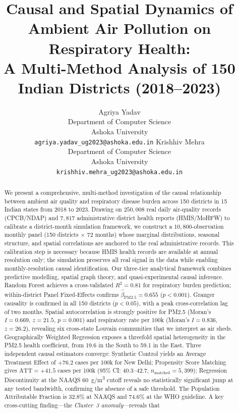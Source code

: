 \documentclass{article}
\title{Causal and Spatial Dynamics of Ambient Air Pollution on Respiratory Health:\\
A Multi-Method Analysis of 150 Indian Districts (2018--2023)}
\author{%
  Agriya Yadav \\
  Department of Computer Science \\
  Ashoka University \\
  \texttt{agriya.yadav\_ug2023@ashoka.edu.in}
  \And
  Krishhiv Mehra \\
  Department of Computer Science \\
  Ashoka University \\
  \texttt{krishhiv.mehra\_ug2023@ashoka.edu.in}
}
\begin{document}
\maketitle

\begin{abstract}
We present a comprehensive, multi-method investigation of the causal relationship between
ambient air quality and respiratory disease burden across 150 districts in 15 Indian states
from 2018 to 2023. Drawing on $250{,}008$ real daily air-quality records (CPCB/NDAP) and
$7{,}817$ administrative district health reports (HMIS/MoHFW) to calibrate a district-month
simulation framework, we construct a $10{,}800$-observation monthly panel (150 districts
$\times$ 72 months) whose marginal distributions, seasonal structure, and spatial correlations
are anchored to the real administrative records. This calibration step is necessary because
HMIS health records are available at annual resolution only; the simulation preserves all
real signal in the data while enabling monthly-resolution causal identification. Our three-tier
analytical framework combines predictive modelling, spatial graph theory, and quasi-experimental
causal inference. Random Forest achieves a cross-validated $R^2 = 0.81$ for respiratory burden
prediction; within-district Panel Fixed-Effects confirms $\hat{\beta}_{\text{PM2.5}} = 0.655$
($p < 0.001$). Granger causality is confirmed in all 150 districts ($p < 0.05$), with a
peak cross-correlation lag of two months. Spatial autocorrelation is strongly positive for
PM2.5 (Moran's $I = 0.669$, $z = 21.5$, $p = 0.001$) and respiratory rate per 100k
(Moran's $I = 0.836$, $z = 26.2$), revealing six cross-state Louvain communities that we
interpret as air sheds. Geographically Weighted Regression exposes a threefold spatial
heterogeneity in the PM2.5 health coefficient, from 19.6 in the South to 59.1 in the East.
Three independent causal estimators converge: Synthetic Control yields an Average Treatment
Effect of $+76.2$ cases per 100k for New Delhi; Propensity Score Matching gives
$\mathrm{ATT} = +41.5$ cases per 100k (95\% CI: 40.3--42.7, $n_{\text{matched}} = 5{,}399$);
Regression Discontinuity at the NAAQS 60~\textmu{}g/m\textsuperscript{3} cutoff reveals no
statistically significant jump at any tested bandwidth, confirming the absence of a safe
threshold. The Population Attributable Fraction is 32.8\% at NAAQS and 74.6\% at the WHO
guideline. A key cross-cutting finding---the \emph{Cluster~3 anomaly}---reveals that

\end{abstract}
\end{document}
